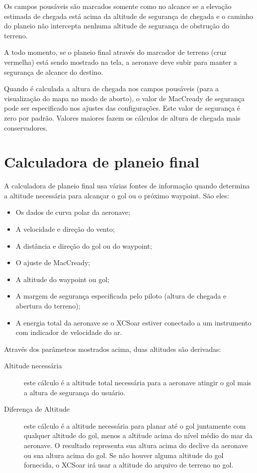 Os campos pousáveis são marcados somente como no alcance se a elevação estimada de chegada está acima da altitude de segurança de chegada e o caminho do planeio não intercepta nenhuma altitude de segurança de obstrução do terreno.

A todo momento, se o planeio final através do marcador de terreno (cruz vermelha) está sendo mostrado na tela, a aeronave deve subir para manter a segurança de alcance do destino.

Quando é calculada a altura de chegada nos campos pousáveis (para a visualização do mapa no modo de aborto), o valor de MacCready de segurança pode ser especificado nos ajustes das configurações.  Este valor de segurança é zero por padrão.  Valores maiores fazem os cálculos de altura de chegada mais conservadores.

\section{Calculadora de planeio final}

A calculadora de planeio final usa várias fontes de informação quando determina a altitude necessária para alcançar o gol ou o próximo waypoint.  São eles:

\begin{itemize}
\item Os dados de curva polar da aeronave;
\item A velocidade e direção do vento;
\item A distância e direção do gol ou do waypoint;
\item O ajuste de MacCready;
\item A altitude do waypoint ou gol;
\item A margem de segurança especificada pelo piloto (altura de chegada e abertura do terreno);
\item A energia total da aeronave se o XCSoar estiver conectado a um instrumento com indicador de velocidade do ar.
\end{itemize}

Através dos parâmetros mostrados acima, duas altitudes são derivadas:
\begin{description}
\item[Altitude necessária]
este cálculo é a altitude total necessária para a aeronave atingir o gol mais a altura de segurança do usuário.
\item[Diferença de Altitude]
este cálculo é a altitude necessária para planar até o gol juntamente com qualquer altitude do gol, menos a altitude acima do nível médio do mar da aeronave.  O resultado representa sua altura acima do declive da aeronave ou sua altura acima do gol.  Se não houver alguma altitude do gol fornecida, o XCSoar irá usar a altitude do arquivo de terreno no gol.
\end{description}

